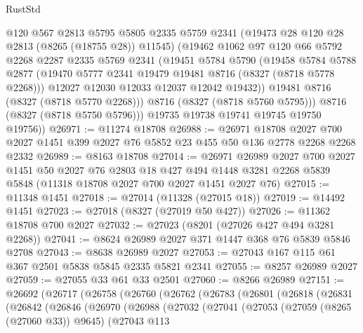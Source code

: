 \begin{lexlean}{RustStd}
\begin{coremodule}
{\begin{coremodule}
{{{{{{{{{{{{{{{{{{{{{{{{{{{{{{{{{{{{{{{{{{{{{{{{{{{{{{            @120
            @567
            @2813
            @5795
            @5805
            @2335
            @5759
            @2341
            (@19473 @28 @120 @28 @2813 (@8265 (@18755 @28)) @11545)
            (@19462
              @1062
              @97
              @120
              @66
              @5792
              @2268
              @2287
              @2335
              @5769
              @2341
              (@19451
                @5784
                @5790
                (@19458
                  @5784
                  @5788
                  @2877
                  (@19470 @5777 @2341 @19479 @19481 @8716 (@8327 (@8718 @5778 @2268)))
                  @12027
                  @12030
                  @12033
                  @12037
                  @12042
                  @19432))
              @19481
              @8716
              (@8327 (@8718 @5770 @2268)))
            @8716
            (@8327 (@8718 @5760 @5795)))
          @8716
          (@8327 (@8718 @5750 @5796)))
        @19735
        @19738
        @19741
        @19745
        @19750
        @19756))
@26971 := @11274 @18708
@26988 := @26971
    @18708
    @2027
    @700
    @2027
    @1451
    @399
    @2027
    @76
    @5852
    @23
    @455
    @50
    @136
    @2778
    @2268
    @2268
    @2332
@26989 := @8163 @18708
@27014 := @26971
    @26989
    @2027
    @700
    @2027
    @1451
    @50
    @2027
    @76
    @2803
    @18
    @427
    @494
    @1448
    @3281
    @2268
    @5839
    @5848
    (@11318 @18708 @2027 @700 @2027 @1451 @2027 @76)
@27015 := @11348 @1451
@27018 := @27014 (@11328 (@27015 @18))
@27019 := @14492 @1451
@27023 := @27018 (@8327 (@27019 @50 @427))
@27026 := @11362 @18708 @700 @2027
@27032 := @27023 (@8201 (@27026 @427 @494 @3281 @2268))
@27041 := @8624 @26989 @2027 @371 @1447 @368 @76 @5839 @5846 @2708
@27043 := @8638 @26989 @2027
@27053 := @27043 @167 @115 @61 @367 @2501 @5838 @5845 @2335 @5821 @2341
@27055 := @8257 @26989 @2027
@27059 := @27055 @33 @61 @33 @2501
@27060 := @8266 @26989
@27151 := @26692
    (@26717
      (@26758
        (@26760
          (@26762
            (@26783
              (@26801
                (@26818
                  (@26831
                    (@26842
                      (@26846
                        (@26970
                          (@26988
                            (@27032
                              (@27041
                                (@27053
                                  (@27059 (@8265 (@27060 @33)) @9645)
                                  (@27043
                                    @113
}}}}}}}}}}}}}}}}}}}}}}}}}}}}}}}}}}}}}}}}}}}}}}}}}}}}}}
\end{coremodule}}
\end{coremodule}
\end{lexlean}
